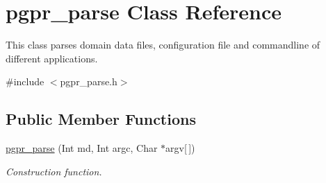 \hypertarget{classpgpr__parse}{\section{pgpr\+\_\+parse Class Reference}
\label{classpgpr__parse}
}


This class parses domain data files, configuration file and commandline of different applications.  




{\ttfamily \#include $<$pgpr\+\_\+parse.\+h$>$}

\subsection*{Public Member Functions}
\begin{DoxyCompactItemize}
\item 
\hyperlink{classpgpr__parse_a3e6e01f2423c4a3a48dcd134d0a86385}{pgpr\+\_\+parse} (Int md, Int argc, Char $\ast$argv\mbox{[}$\,$\mbox{]})
\begin{DoxyCompactList}\small\item\em Construction function. \end{DoxyCompactList}\end{DoxyCompactItemize}
